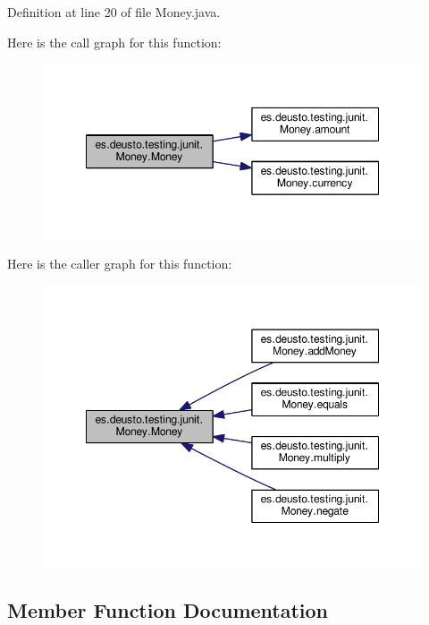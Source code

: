 Definition at line 20 of file Money.\+java.



Here is the call graph for this function\+:\nopagebreak
\begin{figure}[H]
\begin{center}
\leavevmode
\includegraphics[width=348pt]{classes_1_1deusto_1_1testing_1_1junit_1_1_money_a6f1749eb364c59ed038f79cf8965e3bc_cgraph}
\end{center}
\end{figure}




Here is the caller graph for this function\+:\nopagebreak
\begin{figure}[H]
\begin{center}
\leavevmode
\includegraphics[width=348pt]{classes_1_1deusto_1_1testing_1_1junit_1_1_money_a6f1749eb364c59ed038f79cf8965e3bc_icgraph}
\end{center}
\end{figure}




\subsection{Member Function Documentation}
